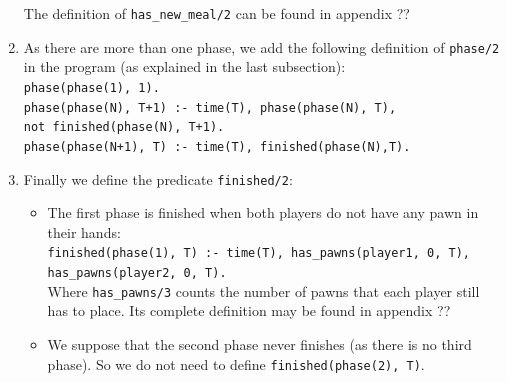 \begin{enumerate}
The definition of \texttt{has\_new\_meal/2} can be found in appendix ??

\item As there are more than one phase, we add the following definition of \texttt{phase/2} in the program (as explained in the last subsection):\\
\texttt{phase(phase(1), 1).}\\
\texttt{phase(phase(N), T+1) :- time(T), phase(phase(N), T),\\ not finished(phase(N), T+1).}\\
\texttt{phase(phase(N+1), T) :- time(T), finished(phase(N),T).}

\item Finally we define the predicate \texttt{finished/2}:
\begin{itemize}
\item The first phase is finished when both players do not have any pawn in their hands: \\
\texttt{finished(phase(1), T) :- time(T), has\_pawns(player1, 0, T), \\has\_pawns(player2, 0, T).}\\
Where \texttt{has\_pawns/3} counts the number of pawns that each player still has to place. Its complete definition may be found in appendix ??
\item We suppose that the second phase never finishes (as there is no third phase). So we do not need to define \texttt{finished(phase(2), T)}. 
\end{itemize}

\end{enumerate}